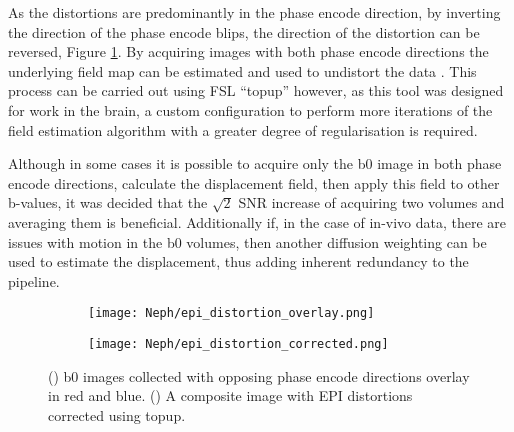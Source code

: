 As the distortions are predominantly in the phase encode direction, by inverting the direction of the phase encode blips, the direction of the distortion can be reversed, Figure \ref{fig:ex_epi_distortion_overlay}. By acquiring images with both phase encode directions the underlying field map can be estimated and used to undistort the data \cite{andersson_how_2003}. This process can be carried out using \ac{FSL} ``topup'' however, as this tool was designed for work in the brain, a custom configuration to perform more iterations of the field estimation algorithm with a greater degree of regularisation is required. 

Although in some cases it is possible to acquire only the b0 image in both phase encode directions, calculate the displacement field, then apply this field to other b-values, it was decided that the $\sqrt{2}$ \ac{SNR} increase of acquiring two volumes and averaging them is beneficial. Additionally if, in the case of in-vivo data, there are issues with motion in the b0 volumes, then another diffusion weighting can be used to estimate the displacement, thus adding inherent redundancy to the pipeline.

\begin{figure}[H]
	\centering
	\begin{subfigure}[c]{0.47\textwidth}
		\centering
		\texttt{[image: Neph/epi\_distortion\_overlay.png]}
		\caption{}
		\label{fig:ex_epi_distortion_overlay}
	\end{subfigure}
	\hfill
	\begin{subfigure}[c]{0.47\textwidth}
		\centering
		\texttt{[image: Neph/epi\_distortion\_corrected.png]}
		\caption{}
		\label{fig:ex_epi_distortion_corrected}
	\end{subfigure}
	\caption{() b0 images collected with opposing phase encode directions overlay in red and blue. () A composite image with \ac{EPI} distortions corrected using topup.}
	\label{fig:ex_epi_distortion}
\end{figure}

